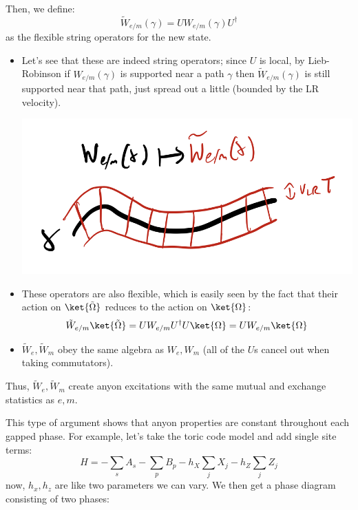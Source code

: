 Then, we define:
\begin{equation}
    \tilde{W}_{e/m}(\gamma) = U W_{e/m}(\gamma)U^\dag
\end{equation}
as the flexible string operators for the new state.

\begin{itemize}
    \item Let's see that these are indeed string operators; since $U$ is local, by Lieb-Robinson if $W_{e/m}(\gamma)$ is supported near a path $\gamma$ then $\tilde{W}_{e/m}(\gamma)$ is still supported near that path, just spread out a little (bounded by the LR velocity).

    \begin{center}
        \includegraphics[scale=0.35]{Lectures/Images/lec12-broadstringops.png}
    \end{center}

    \item These operators are also flexible, which is easily seen by the fact that their action on $\ket{\tilde{\Omega}}$ reduces to the action on $\ket{\Omega}$:
    \begin{equation}
        \tilde{W}_{e/m}\ket{\tilde{\Omega}} = UW_{e/m}U^\dag U\ket{\Omega} = UW_{e/m}\ket{\Omega}
    \end{equation}
    \item $\tilde{W}_{e}, \tilde{W}_{m}$ obey the same algebra as $W_e, W_m$ (all of the $U$s cancel out when taking commutators).
\end{itemize}

Thus, $\tilde{W}_e, \tilde{W}_m$ create anyon excitations with the same mutual and exchange statistics as $e, m$.

This type of argument shows that anyon properties are constant throughout each gapped phase. For example, let's take the toric code model and add single site terms:
\begin{equation}
    H = -\sum_s A_s - \sum_p B_p - h_X\sum_j X_j - h_Z \sum_j Z_j
\end{equation}
now, $h_x, h_z$ are like two parameters we can vary. We then get a phase diagram consisting of two phases:

